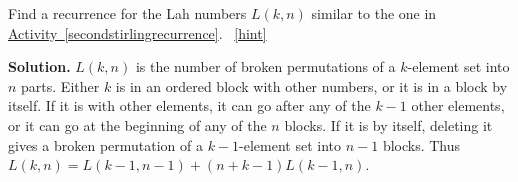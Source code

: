 \documentclass{book}
\begin{document}
\setcounter{project}{201}
\addtocounter{project}{-1}
\begin{activity}[]\label{activity-194}
\hypertarget{p-1157}{}%
Find a recurrence for the Lah numbers \(L(k,n)\) similar to the one in \hyperref[secondstirlingrecurrence]{Activity~\ref{secondstirlingrecurrence}}.%
~\hfill{\tiny\hyperlink{a-201}{[hint]}\hypertarget{q-201}{}}\par\smallskip%
\noindent\textbf{Solution.}\hypertarget{solution-125}{}\quad%
\hypertarget{p-1159}{}%
\(L(k,n)\) is the number of broken permutations of a \(k\)-element set into \(n\) parts. Either \(k\) is in an ordered block with other numbers, or it is in a block by itself. If it is with other elements, it can go after any of the \(k-1\) other elements, or it can go at the beginning of any of the \(n\) blocks. If it is by itself, deleting it gives a broken permutation of a \(k-1\)-element set into \(n-1\) blocks. Thus \(L(k,n)=L(k-1,n-1) + (n+k-1)L(k-1,n)\).%
\end{activity}
\end{document}
